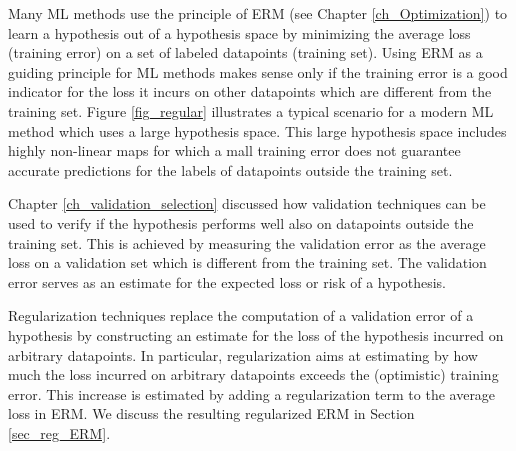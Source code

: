 \documentclass[12pt]{report}
\begin{document}

Many ML methods use the principle of ERM (see Chapter \ref{ch_Optimization}) 
to learn a hypothesis out of a hypothesis space by minimizing the average loss 
(training error) on a set of labeled datapoints (training set). Using ERM as a guiding 
principle for ML methods makes sense only if the training error is a good indicator 
for the loss it incurs on other datapoints which are different from the training set. 
Figure \ref{fig_regular} illustrates a typical scenario for a modern ML method which uses 
a large hypothesis space. This large hypothesis space includes highly non-linear maps 
for which a mall training error does not guarantee accurate predictions for the labels 
of datapoints outside the training set. 


Chapter \ref{ch_validation_selection} discussed how validation techniques 
can be used to verify if the hypothesis performs well also on datapoints 
outside the training set. This is achieved by measuring the validation error 
as the average loss on a validation set which is different from the training set. 
The validation error serves as an estimate for the expected loss or risk of a 
hypothesis. 

Regularization techniques replace the computation of a validation error of a 
hypothesis by constructing an estimate for the loss of the hypothesis incurred 
on arbitrary datapoints. In particular, regularization aims at estimating by how 
much the loss incurred on arbitrary datapoints exceeds the (optimistic) 
training error. This increase is estimated by adding a regularization term 
to the average loss in ERM. We discuss the resulting regularized ERM 
in Section \ref{sec_reg_ERM}. 
\end{document}

